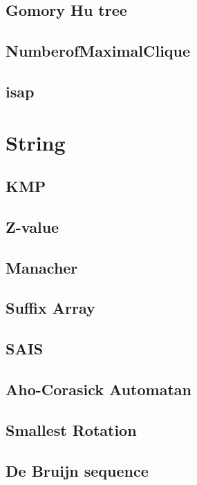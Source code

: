\subsection{Gomory Hu tree}

\subsection{NumberofMaximalClique}

\subsection{isap}



\section{String}
\subsection{KMP}

\subsection{Z-value}

\subsection{Manacher}

\subsection{Suffix Array}

\subsection{SAIS}

\subsection{Aho-Corasick Automatan}

\subsection{Smallest Rotation}


\subsection{De Bruijn sequence}

